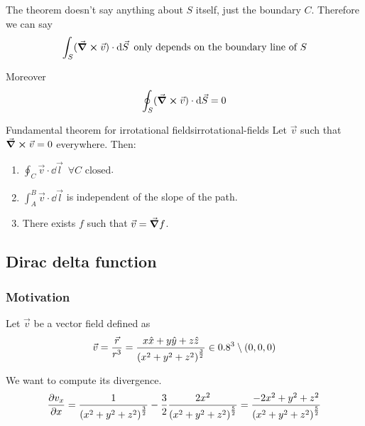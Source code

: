 \documentclass[12pt]{extarticle}
\begin{document}
\begin{corollary}{}{}
    The theorem doesn't say anything about $S$ itself, just the boundary $C$.
    Therefore we can say
    \begin{equation}
        \int_S (\curl \vec v) \cdot \dd{\vec S} \text{ only depends on the boundary line of } S
    \end{equation}

    Moreover
    \begin{equation}
        \oint_S (\curl \vec v) \cdot \dd{\vec S} = 0
    \end{equation}
\end{corollary}

\begin{theorem}{Fundamental theorem for irrotational fields}{irrotational-fields}
    Let $\vec v$ such that $\curl \vec v = 0$ everywhere.
    Then:
    \begin{enumerate}
        \item $\oint_C \vec v \cdot \dd{\vec l} \enspace \forall C \text{ closed}$.
        \item $\int_A^B \vec v \cdot \dd{\vec l}$ is independent of the slope of the path.
        \item There exists $f$ such that $\vec v = \grad f$.
    \end{enumerate}
\end{theorem}

\subsection{Dirac delta function}

\subsubsection{Motivation}

Let $\vec v$ be a vector field defined as
\begin{equation}
    \vec v = \frac{\vec r}{r^3} = \frac{x \hat x + y \hat y + z \hat z}{\left( x^2 + y^2 + z^2\right)^{\frac{3}{2}}} \in 0.8^3 \setminus (0,0,0)
\end{equation}

We want to compute its divergence.
\begin{equation}
    \pdv{v_x}{x} = \frac{1}{\left( x^2 + y^2 + z^2\right)^{\frac{3}{2}}} - \frac{3}{2}\frac{2 x^2}{\left( x^2 + y^2 + z^2\right)^{\frac{5}{2}}} = \frac{-2x^2 + y^2 + z^2}{\left( x^2 + y^2 + z^2\right)^{\frac{5}{2}}}
\end{equation}
\end{document}
